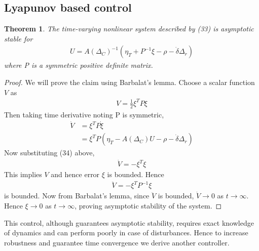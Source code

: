 \documentclass[]{article}
\newtheorem{theorem}{Theorem}
\theoremstyle{remark}
\theoremstyle{definition}
\begin{document}
	\subsection{Lyapunov based control}
	\begin{theorem}
	The time-varying nonlinear system described by (33) is asymptotic stable for \begin{align}
		U = A(\Delta_C)^{-1}(\eta_T + P^{-1}\xi - \rho-\dot\delta\Delta_r)
	\end{align}  where P is a symmetric positive definite matrix.	
	\end{theorem} 
\begin{proof}
 We will prove the claim using Barbalat's lemma.  Choose a scalar function $V$ as
\begin{align}
	V = \frac{1}{2}\xi^TP\xi
\end{align}
Then taking time derivative noting P is symmetric,
\begin{align}
	\dot V &= \xi^TP\dot\xi \\
	& = \xi^TP(\eta_T -  A(\Delta_C)U-\rho - \dot \delta \Delta_r)
\end{align}
Now substituting (34) above,
\begin{align}
	\dot V = -\xi^T\xi
\end{align}
This implies $V$ and hence error $\xi$ is bounded.
Hence \begin{align}
	\ddot V = -\xi^TP^{-1}\xi
\end{align}
is bounded. 
Now from Barbalat's lemma, since $\ddot V$ is bounded, $\dot V \to 0$ as $t\to \infty$. Hence $\xi \to 0$ as $t\to \infty$, proving asymptotic stability of the system.

\end{proof}
This control, although guarantees asymptotic stability, requires exact knowledge of dynamics and can perform poorly in case of disturbances. Hence to increase robustness and guarantee time convergence we derive another controller.
\end{document}
